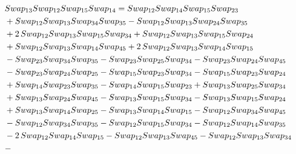 \documentclass[10pt,a4paper]{amsart}
\begin{document}
\begin{align*}
        \\
        &\textnormal{Swap}_{13}   \textnormal{Swap}_{12}   \textnormal{Swap}_{15}   \textnormal{Swap}_{14} = \textnormal{Swap}_{12} \textnormal{Swap}_{14} \textnormal{Swap}_{15} \textnormal{Swap}_{23} \\ & + \textnormal{Swap}_{12} \textnormal{Swap}_{13} \textnormal{Swap}_{34} \textnormal{Swap}_{35} - \textnormal{Swap}_{12} \textnormal{Swap}_{13} \textnormal{Swap}_{24} \textnormal{Swap}_{35}\\ & + 2\,\textnormal{Swap}_{12} \textnormal{Swap}_{13} \textnormal{Swap}_{15} \textnormal{Swap}_{34} +
        \textnormal{Swap}_{12} \textnormal{Swap}_{13} \textnormal{Swap}_{15} \textnormal{Swap}_{24}\\ & + \textnormal{Swap}_{12} \textnormal{Swap}_{13} \textnormal{Swap}_{14} \textnormal{Swap}_{45} + 2\,\textnormal{Swap}_{12} \textnormal{Swap}_{13} \textnormal{Swap}_{14} \textnormal{Swap}_{15}\\ & - \textnormal{Swap}_{23} \textnormal{Swap}_{34} \textnormal{Swap}_{35} -
        \textnormal{Swap}_{23} \textnormal{Swap}_{25} \textnormal{Swap}_{34} - \textnormal{Swap}_{23} \textnormal{Swap}_{24} \textnormal{Swap}_{45}\\ & - \textnormal{Swap}_{23} \textnormal{Swap}_{24} \textnormal{Swap}_{25} - \textnormal{Swap}_{15} \textnormal{Swap}_{23} \textnormal{Swap}_{34} - \textnormal{Swap}_{15} \textnormal{Swap}_{23} \textnormal{Swap}_{24}\\ & +
        \textnormal{Swap}_{14} \textnormal{Swap}_{23} \textnormal{Swap}_{35} - \textnormal{Swap}_{14} \textnormal{Swap}_{15} \textnormal{Swap}_{23} + \textnormal{Swap}_{13} \textnormal{Swap}_{25} \textnormal{Swap}_{34}\\ & + \textnormal{Swap}_{13} \textnormal{Swap}_{24} \textnormal{Swap}_{45} - \textnormal{Swap}_{13} \textnormal{Swap}_{15} \textnormal{Swap}_{34} -
        \textnormal{Swap}_{13} \textnormal{Swap}_{15} \textnormal{Swap}_{24}\\ & + \textnormal{Swap}_{13} \textnormal{Swap}_{14} \textnormal{Swap}_{25} - \textnormal{Swap}_{13} \textnormal{Swap}_{14} \textnormal{Swap}_{15} - \textnormal{Swap}_{12} \textnormal{Swap}_{34} \textnormal{Swap}_{45}\\ & - \textnormal{Swap}_{12} \textnormal{Swap}_{34} \textnormal{Swap}_{35} -
        \textnormal{Swap}_{12} \textnormal{Swap}_{15} \textnormal{Swap}_{34} - \textnormal{Swap}_{12} \textnormal{Swap}_{14} \textnormal{Swap}_{35}\\ & - 2\,\textnormal{Swap}_{12} \textnormal{Swap}_{14} \textnormal{Swap}_{15} - \textnormal{Swap}_{12} \textnormal{Swap}_{13} \textnormal{Swap}_{45} - \textnormal{Swap}_{12} \textnormal{Swap}_{13} \textnormal{Swap}_{34}\\ & -

\end{align*}
\end{document}
